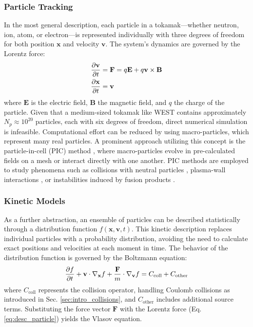 \subsubsection{Particle Tracking}
\label{ssec:desc_particleTracking}
In the most general description, each particle in a tokamak—whether neutron, ion, atom, or electron—is represented individually with three degrees of freedom for both position $\mathbf{x}$ and velocity $\mathbf{v}$. The system's dynamics are governed by the Lorentz force:
\begin{align}
	\pdv{\mathbf{v}}{t} &= \mathbf{F} = q\mathbf{E} + q\mathbf{v} \times \mathbf{B} \label{eq:desc_particle}\\
	\pdv{\mathbf{x}}{t} &= \mathbf{v}
\end{align}
where $\mathbf{E}$ is the electric field, $\mathbf{B}$ the magnetic field, and $q$ the charge of the particle. \newline
Given that a medium-sized tokamak like WEST contains approximately $N_p \approx 10^{20}$ particles, each with six degrees of freedom, direct numerical simulation is infeasible. Computational effort can be reduced by using macro-particles, which represent many real particles. A prominent approach utilizing this concept is the particle-in-cell (PIC) method \cite{tskhakaya2007particle}, where macro-particles evolve in pre-calculated fields on a mesh or interact directly with one another. PIC methods are employed to study phenomena such as collisions with neutral particles \cite{birdsall1991particle}, plasma-wall interactions \cite{khaziev2018hpic}, or instabilities induced by fusion products \cite{cook2013particle}.



\subsubsection{Kinetic Models}
\label{ssec:desc_kineticModels}
As a further abstraction, an ensemble of particles can be described statistically through a distribution function $f(\mathbf{x}, \mathbf{v},t)$. This kinetic description replaces individual particles with a probability distribution, avoiding the need to calculate exact positions and velocities at each moment in time. The behavior of the distribution function is governed by the Boltzmann equation:
\begin{equation}
	\label{eq:BoltzmannEquationKineticDescription}
	\pdv{f}{t} + \mathbf{v} \cdot \nabla_{\mathbf{x}} f + \frac{\mathbf{F}}{m} \cdot \nabla_{\mathbf{v}} f = C_{\text{coll}} + C_{\text{other}}
\end{equation}
where $C_{\text{coll}}$ represents the collision operator, handling Coulomb collisions as introduced in Sec. \ref{sec:intro_collisions}, and $C_{\text{other}}$ includes additional source terms. Substituting the force vector $\mathbf{F}$ with the Lorentz force (Eq. \ref{eq:desc_particle}) yields the Vlasov equation. \newline

